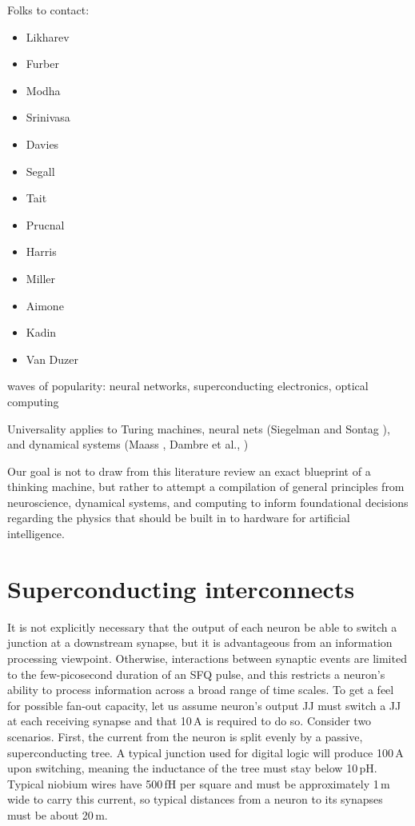 \documentclass[twocolumn]{article}
\begin{document}
\vspace{3em}
Folks to contact:
\begin{itemize} 
\item Likharev
\item Furber
\item Modha
\item Srinivasa
\item Davies
\item Segall
\item Tait
\item Prucnal
\item Harris
\item Miller
\item Aimone
\item Kadin
\item Van Duzer
\end{itemize}
	
\vspace{3em}
waves of popularity: neural networks, superconducting electronics, optical computing	
	
\vspace{3em}
Universality applies to Turing machines, neural nets (Siegelman and Sontag \cite{siso1991}), and dynamical systems (Maass \cite{}, Dambre et al., \cite{dave2012})	

\vspace{3em}
Our goal is not to draw from this literature review an exact blueprint of a thinking machine, but rather to attempt a compilation of general principles from neuroscience, dynamical systems, and computing to inform foundational decisions regarding the physics that should be built in to hardware for artificial intelligence.
	
\newpage
\appendix

\section{\label{sec:superconducting_interconnects}Superconducting interconnects}
It is not explicitly necessary that the output of each neuron be able to switch a junction at a downstream synapse, but it is advantageous from an information processing viewpoint. Otherwise, interactions between synaptic events are limited to the few-picosecond duration of an SFQ pulse, and this restricts a neuron's ability to process information across a broad range of time scales. To get a feel for possible fan-out capacity, let us assume neuron's output JJ must switch a JJ at each receiving synapse and that 10\,\textmu A is required to do so. Consider two scenarios. First, the current from the neuron is split evenly by a passive, superconducting tree. A typical junction used for digital logic will produce 100\,\textmu A upon switching, meaning the inductance of the tree must stay below 10\,pH. Typical niobium wires have 500\,fH per square and must be approximately 1\,\textmu m wide to carry this current, so typical distances from a neuron to its synapses must be about 20\,\textmu m.
\end{document}
